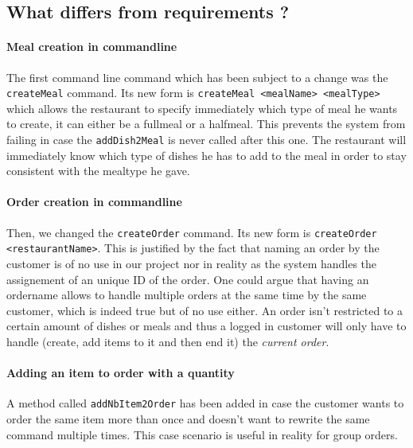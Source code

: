 \subsection{What differs from requirements ?} %
\label{sub:what_differs_from_requirements}

\paragraph{Meal creation in commandline} %
\label{par:meal_creation_in_commandline}
The first command line command which has been subject to a change
was the \lstinline|createMeal| command. Its new form is
\lstinline|createMeal <mealName> <mealType>|
which allows the restaurant to specify immediately which type of meal
he wants to create, it can either be a fullmeal or a halfmeal.
This prevents the system from failing in case the \lstinline|addDish2Meal|
is never called after this one.
The restaurant will immediately know which type of dishes he has to add
to the meal in order to stay consistent with the mealtype he gave. 

\paragraph{Order creation in commandline} %
\label{par:order_creation_in_commandline}
Then, we changed the \lstinline|createOrder| command. Its new form is
\lstinline|createOrder <restaurantName>|.
This is justified by the fact that naming an order by the customer
is of no use in our project nor in reality as the system
handles the assignement of an unique ID of the order.
One could argue that having an ordername allows to handle
multiple orders at the same time by the same customer,
which is indeed true but of no use either.
An order isn't restricted to a certain amount of dishes
or meals and thus a logged in customer will only
have to handle (create, add items to it and then end it)
the \emph{current order}.

\paragraph{Adding an item to order with a quantity} %
\label{par:add_an_item_to_order_with_a_quantity}
A method called \lstinline|addNbItem2Order| has been added
in case the customer wants to order the same item more than once
and doesn't want to rewrite the same command multiple times.
This case scenario is useful in reality for group orders.

